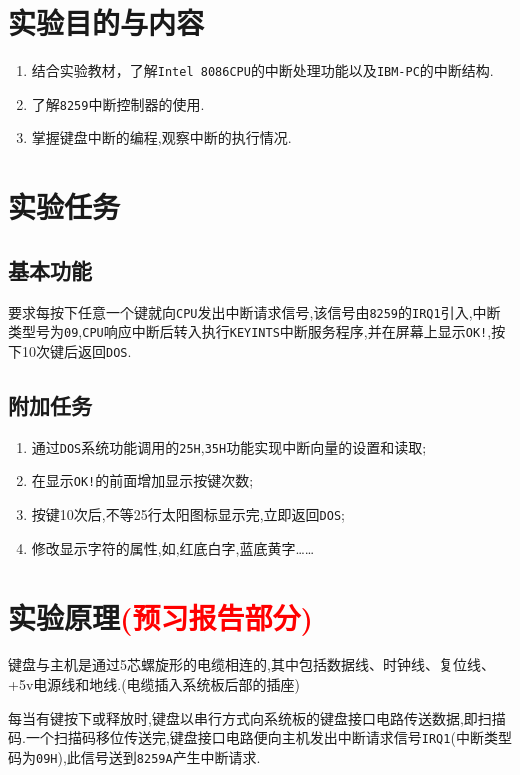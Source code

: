 \documentclass[11pt]{SEU-Digital-Report}
\begin{document}
\exptitlepage

\tableofcontents
\newpage

\section{实验目的与内容}       
\begin{enumerate}
    \item 结合实验教材\cite{book,guide}，了解\texttt{Intel 8086CPU}的中断处理功能以及\texttt{IBM-PC}的中断结构.
    \item 了解\texttt{8259}中断控制器的使用.
    \item 掌握键盘中断的编程,观察中断的执行情况. 
\end{enumerate}

\section{实验任务}
\subsection{基本功能}
要求每按下任意一个键就向\texttt{CPU}发出中断请求信号,该信号由\texttt{8259}的\texttt{IRQ1}引入,中断类型号为\texttt{09},\texttt{CPU}响应中断后转入执行\texttt{KEYINTS}中断服务程序,并在屏幕上显示\texttt{OK!},按下10次键后返回\texttt{DOS}.

\subsection{附加任务}
\begin{enumerate}
    \item 通过\texttt{DOS}系统功能调用的\texttt{25H},\texttt{35H}功能实现中断向量的设置和读取;
    \item 在显示\texttt{OK!}的前面增加显示按键次数;
    \item 按键10次后,不等25行太阳图标显示完,立即返回\texttt{DOS};
    \item 修改显示字符的属性,如,红底白字,蓝底黄字…… 
\end{enumerate}

\section{实验原理\textcolor{red}{(预习报告部分)}}
键盘与主机是通过5芯螺旋形的电缆相连的,其中包括数据线、时钟线、复位线、+5v电源线和地线.(电缆插入系统板后部的插座)

每当有键按下或释放时,键盘以串行方式向系统板的键盘接口电路传送数据,即扫描码.一个扫描码移位传送完,键盘接口电路便向主机发出中断请求信号\texttt{IRQ1}(中断类型码为\texttt{09H}),此信号送到\texttt{8259A}产生中断请求.
\end{document}
